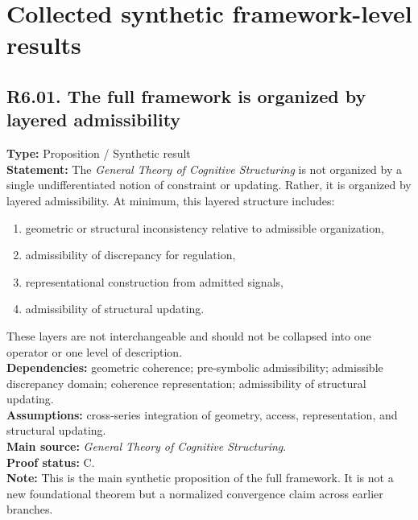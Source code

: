 \documentclass[12pt]{article}
\begin{document}
	\section{Collected synthetic framework-level results}
	
	\subsection*{R6.01. The full framework is organized by layered admissibility}
	\textbf{Type:} Proposition / Synthetic result \\
	\textbf{Statement:} The \emph{General Theory of Cognitive Structuring} is not organized by a
	single undifferentiated notion of constraint or updating. Rather, it is organized by layered
	admissibility. At minimum, this layered structure includes:
	\begin{enumerate}[leftmargin=2em]
		\item geometric or structural inconsistency relative to admissible organization,
		\item admissibility of discrepancy for regulation,
		\item representational construction from admitted signals,
		\item admissibility of structural updating.
	\end{enumerate}
	These layers are not interchangeable and should not be collapsed into one operator or one level
	of description. \\
	\textbf{Dependencies:} geometric coherence; pre-symbolic admissibility; admissible discrepancy
	domain; coherence representation; admissibility of structural updating. \\
	\textbf{Assumptions:} cross-series integration of geometry, access, representation, and
	structural updating. \\
	\textbf{Main source:} \emph{General Theory of Cognitive Structuring}. \\
	\textbf{Proof status:} C. \\
	\textbf{Note:} This is the main synthetic proposition of the full framework. It is not a new
	foundational theorem but a normalized convergence claim across earlier branches.
	
\end{document}
